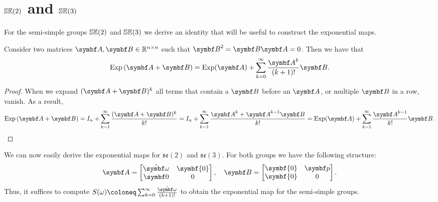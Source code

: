 \section{\texorpdfstring{${\mathbb{SE}(2)}$}{SE(3)} and \texorpdfstring{${\mathbb{SE}(3)}$}{SE(3)}}

For the semi-simple groups ${\mathbb{SE}(2)}$ and ${\mathbb{SE}(3)}$ we derive an identity that will be useful to construct the exponential maps.
\begin{lemma}
  \label{lem:help_exp}
  Consider two matrices $\A , \B \in \mathbb{R}^{n \times n}$ such that $\B^2 = \B\A = 0$. Then we have that
  \begin{equation}
    \Exp \left( \A + \B \right) = \Exp(\A) + \sum\limits_{k = 0}^\infty \frac{\A^{k}}{(k+1)!} \B.
  \end{equation}
\end{lemma}
\begin{proof}
  When we expand $(\A+\B)^k$ all terms that contain a $\B$ before an $\A$, or multiple $\B$ in a row, vanish. As a result,
  \begin{equation}
    \Exp \left( \A + \B \right) = I_n + \sum\limits_{k=1}^\infty \frac{(\A+\B)^k}{k!} = I_n + \sum\limits_{k=1}^\infty \frac{\A^k + \A^{k-1}\B }{k!} = \Exp(\A) + \sum\limits_{k=1}^\infty \frac{\A^{k-1}}{k!} \B.
  \end{equation}
\end{proof}

We can now easily derive the exponential maps for $\mathfrak{se}(2)$ and $\mathfrak{se}(3)$. For both groups we have the following structure:
\begin{equation}
  \A = \begin{bmatrix} \hat \bomega & \symbf{0} \\ \symbf 0 & 0 \end{bmatrix}, \quad \B = \begin{bmatrix} \symbf{0} & \bp \\ \symbf{0} & 0 \end{bmatrix}.
\end{equation}
Thus, it suffices to compute $S(\omega) \coloneq \sum_{k = 0}^\infty \frac{\hat \bomega}{(k+1)!}$ to obtain the exponential map for the semi-simple groups.

